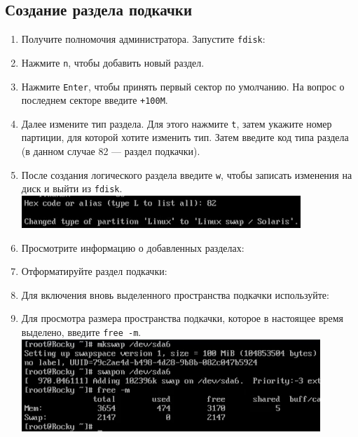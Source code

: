 \documentclass[12pt]{article}
\begin{document}
\subsection{Создание раздела подкачки}
\begin{enumerate}
	\item Получите полномочия администратора. Запустите \texttt{fdisk}:
	\item Нажмите \texttt{n}, чтобы добавить новый раздел.
	\item Нажмите \texttt{Enter}, чтобы принять первый сектор по умолчанию. На вопрос о последнем секторе введите \texttt{+100M}.
	\item Далее измените тип раздела. Для этого нажмите \texttt{t}, затем укажите номер партиции, для которой хотите изменить тип.
	      Затем введите код типа раздела (в данном случае 82 — раздел подкачки).
	\item После создания логического раздела введите \texttt{w}, чтобы записать изменения на диск и выйти из \texttt{fdisk}.
	      \\\includegraphics{4.png}
	\item Просмотрите информацию о добавленных разделах:
	\item Отформатируйте раздел подкачки:
	\item Для включения вновь выделенного пространства подкачки используйте:
	\item Для просмотра размера пространства подкачки, которое в настоящее время выделено, введите \texttt{free -m}.
	      \\\includegraphics{5.png}
\end{enumerate}
\end{document}
